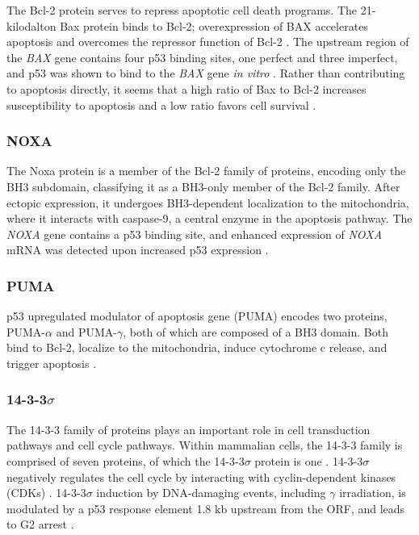 The Bcl-2 protein serves to repress apoptotic cell death programs. The \num{21}-kilodalton Bax protein binds to Bcl-2; overexpression of BAX accelerates apoptosis and overcomes the repressor function of Bcl-2 \parencite{oltvaiBcl2HeterodimerizesVivo1993}. The upstream region of the \textit{BAX} gene contains four p53 binding sites, one perfect and three imperfect, and p53 was shown to bind to the \textit{BAX} gene \textit{in vitro} \parencite{miyashitaTumorSuppressorP531995}. Rather than contributing to apoptosis directly, it seems that a high ratio of Bax to Bcl-2 increases susceptibility to apoptosis and a low ratio favors cell survival \parencite{putriBaxBcl2Ratio2025}.

\subsubsection{NOXA}

The Noxa protein is a member of the Bcl-2 family of proteins, encoding only the BH3 subdomain, classifying it as a BH3-only member of the Bcl-2 family. After ectopic expression, it undergoes BH3-dependent localization to the mitochondria, where it interacts with caspase-9, a central enzyme in the apoptosis pathway. The \textit{NOXA} gene contains a p53 binding site, and enhanced expression of \textit{NOXA} mRNA was detected upon increased p53 expression \parencite{odaNoxaBH3OnlyMember2000a}.

\subsubsection{PUMA}

p53 upregulated modulator of apoptosis gene (PUMA) encodes two proteins, PUMA-\(\alpha\) and PUMA-\(\gamma\), both of which are composed of a BH3 domain. Both bind to Bcl-2, localize to the mitochondria, induce cytochrome c release, and trigger apoptosis \parencite{nakanoPUMANovelProapoptotic2001}.

\subsubsection{14-3-3\(\sigma\)}

The 14-3-3 family of proteins plays an important role in cell transduction pathways and cell cycle pathways. Within mammalian cells, the 14-3-3 family is comprised of seven proteins, of which the 14-3-3\(\sigma\) protein is one \parencite{fu1433ProteinsStructure2000, yaffeStructuralBasis14331997, aitken1433ProteinsMAP1995}. 14-3-3\(\sigma\) negatively regulates the cell cycle by interacting with cyclin-dependent kinases (CDKs) \parencite{larongaAssociationCyclindependentKinases2000a}. 14-3-3\(\sigma\) induction by DNA-damaging events, including \(\gamma\) irradiation, is modulated by a p53 response element 1.8 kb upstream from the ORF, and leads to G2 arrest \parencite{hermeking1433sP53RegulatedInhibitor1997, larongaAssociationCyclindependentKinases2000a, chan1433SigmaRequiredPrevent1999, leeRegulationP53MDM2Pathway2006}.


